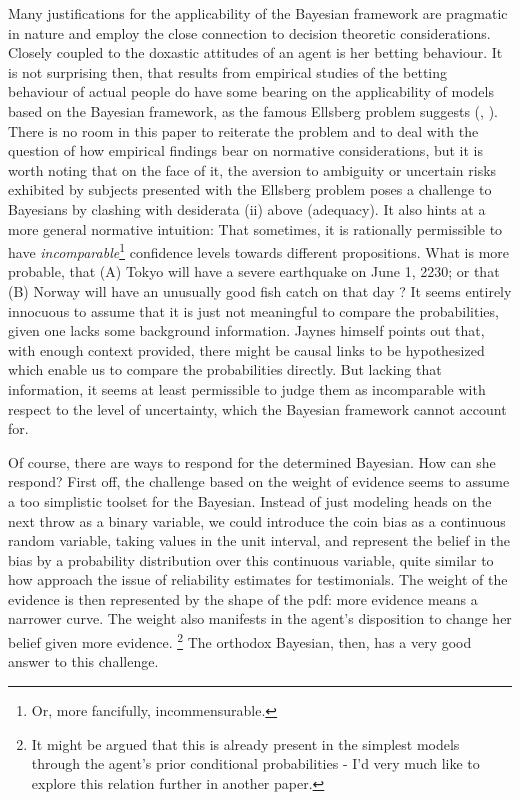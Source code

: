 \documentclass[11pt, a4paper]{scrartcl}
\begin{document}
Many justifications for the applicability of the Bayesian framework are pragmatic in nature and employ the close connection to decision theoretic considerations. Closely coupled to the doxastic attitudes of an agent is her betting behaviour. It is not surprising then, that results from empirical studies of the betting behaviour of actual people do have some bearing on the applicability of models based on the Bayesian framework, as the famous Ellsberg problem suggests (\citet{Ellsberg}, \citet{Camerer1992}). There is no room in this paper to reiterate the problem and to deal with the question of how empirical findings bear on normative considerations, but it is worth noting that on the face of it, the aversion to ambiguity or uncertain risks exhibited by subjects presented with the Ellsberg problem poses a challenge to Bayesians by clashing with desiderata (ii) above (adequacy). It also hints at a more general normative intuition: That sometimes, it is rationally permissible to have \emph{incomparable}\footnote{Or, more fancifully, incommensurable.} confidence levels towards different propositions. What is more probable, that (A) Tokyo will have a severe earthquake on June 1, 2230; or that (B) Norway will have an unusually good fish catch on that day \citep[p.658]{Jaynes2003-JAYPTT}? It seems entirely innocuous to assume that it is just not meaningful to compare the probabilities, given one lacks some background information. Jaynes himself points out that, with enough context provided, there might be causal links to be hypothesized which enable us to compare the probabilities directly. But lacking that information, it seems at least permissible to judge them as incomparable with respect to the level of uncertainty, which the Bayesian framework cannot account for. 

Of course, there are ways to respond for the determined Bayesian. How can she respond? First off, the challenge based on the weight of evidence seems to assume a too simplistic toolset for the Bayesian. Instead of just modeling heads on the next throw as a binary variable, we could introduce the coin bias as a continuous random variable, taking values in the unit interval, and represent the belief in the bias by a probability distribution over this continuous variable, quite similar to how \citet{Olsson2013} approach the issue of reliability estimates for testimonials. The weight of the evidence is then represented by the shape of the pdf: more evidence means a narrower curve. The weight also manifests in the agent's disposition to change her belief given more evidence. \footnote{It might be argued that this is already present in the simplest models through the agent's prior conditional probabilities - I'd very much like to explore this relation further in another paper.} The orthodox Bayesian, then, has a very good answer to this challenge. 
\end{document}
